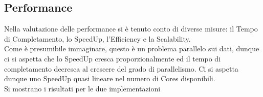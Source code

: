 \documentclass[12pt]{article}
\begin{document}
\subsection{Performance}
Nella valutazione delle performance si \`e tenuto conto di diverse misure: il Tempo di Completamento, lo SpeedUp, l'Efficiency e la Scalability.
\\Come \`e presumibile immaginare, questo \`e un problema parallelo sui dati, dunque ci si aspetta che lo SpeedUp cresca proporzionalmente ed il tempo di completamento decresca al crescere del grado di parallelismo. Ci si aspetta dunque uno SpeedUp quasi lineare nel numero di Cores disponibili.
\\Si mostrano i risultati per le due implementazioni
\end{document}
